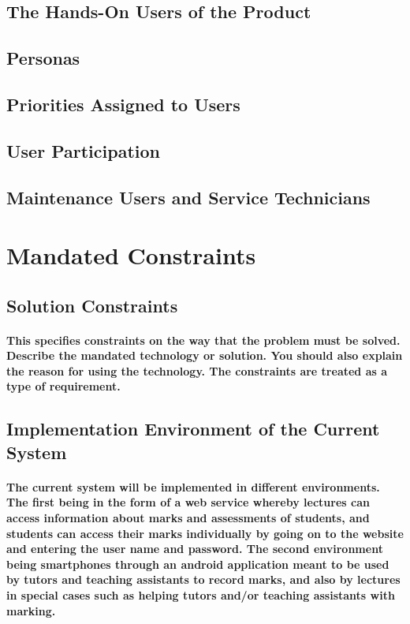 \documentclass[12pt,a4paper]{article}
\begin{document}
\subsection{The Hands-On Users of the Product}
\subsection{Personas}
\subsection{Priorities Assigned to Users}
\subsection{User Participation}
\subsection{Maintenance Users and Service Technicians}
\pagebreak
\section{Mandated Constraints}
\subsection{Solution Constraints}
\paragraph{
This specifies constraints on the way that the problem must be solved. Describe the mandated technology or solution. You should also explain the reason for using the technology. The constraints are treated as a type of requirement.}
\subsection{Implementation Environment of the Current System}
\paragraph{The current system will be implemented in different environments. The first being in the form of a web service whereby lectures can access information about marks and assessments of students, and students can access their marks individually by going on to the website and entering the user name and password.
The second environment being smartphones through an android application meant to be used by tutors and teaching assistants to record marks, and also by lectures in special cases such as helping tutors and/or teaching assistants with marking.}
\end{document}
